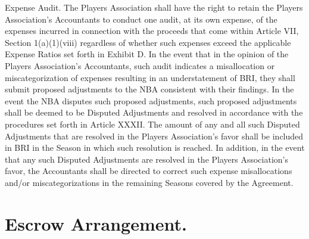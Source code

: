 \documentclass[
]{book}
\begin{document}
\begin{enumerate}
  Expense Audit. The Players Association shall have the right to retain the Players Association's Accountants to conduct one audit, at its own expense, of the expenses incurred in connection with the proceeds that come within Article VII, Section 1(a)(1)(viii) regardless of whether such expenses exceed the applicable Expense Ratios set forth in Exhibit D. In the event that in the opinion of the Players Association's Accountants, such audit indicates a misallocation or miscategorization of expenses resulting in an understatement of BRI, they shall submit proposed adjustments to the NBA consistent with their findings. In the event the NBA disputes such proposed adjustments, such proposed adjustments shall be deemed to be Disputed Adjustments and resolved in accordance with the procedures set forth in Article XXXII. The amount of any and all such Disputed Adjustments that are resolved in the Players Association's favor shall be included in BRI in the Season in which such resolution is reached. In addition, in the event that any such Disputed Adjustments are resolved in the Players Association's favor, the Accountants shall be directed to correct such expense misallocations and/or miscategorizations in the remaining Seasons covered by the Agreement.
\end{enumerate}

\hypertarget{escrow-arrangement.}{%
\section{Escrow Arrangement.}\label{escrow-arrangement.}}
\end{document}
